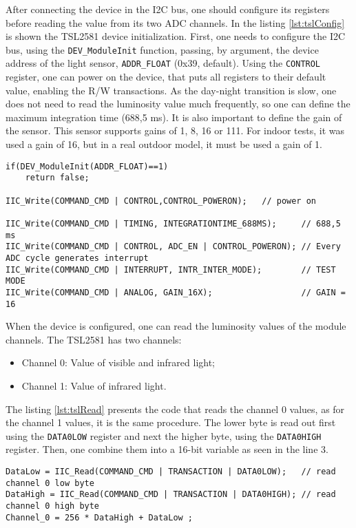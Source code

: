 After connecting the device in the I2C bus, one should configure its registers before reading the value from its two ADC channels. In the listing \ref{lst:tslConfig} is shown the TSL2581 device initialization. First, one needs to configure the I2C bus, using the \verb|DEV_ModuleInit| function, passing, by argument, the device address of the light sensor, \verb|ADDR_FLOAT| (0x39, default). Using the \verb|CONTROL| register, one can power on the device, that puts all registers to their default value, enabling the R/W transactions. As the day-night transition is slow, one does not need to read the luminosity value much frequently, so one can define the maximum integration time (688,5 ms). It is also important to define the gain of the sensor. This sensor supports gains of 1, 8, 16 or 111. For indoor tests, it was used a gain of 16, but in a real outdoor model, it must be used a gain of 1.

\begin{lstlisting}[caption={TSL2581 Initialization.}, label={lst:tslConfig}]
if(DEV_ModuleInit(ADDR_FLOAT)==1)
	return false;

IIC_Write(COMMAND_CMD | CONTROL,CONTROL_POWERON);	// power on

IIC_Write(COMMAND_CMD | TIMING, INTEGRATIONTIME_688MS);  	// 688,5 ms
IIC_Write(COMMAND_CMD | CONTROL, ADC_EN | CONTROL_POWERON); // Every ADC cycle generates interrupt
IIC_Write(COMMAND_CMD | INTERRUPT, INTR_INTER_MODE);		// TEST MODE
IIC_Write(COMMAND_CMD | ANALOG, GAIN_16X);					// GAIN = 16
\end{lstlisting}


When the device is configured, one can read the luminosity values of the module channels. The TSL2581 has two channels: 

\begin{itemize}
	\item Channel 0: Value of visible and infrared light;
	\item Channel 1: Value of infrared light.
\end{itemize}

The listing \ref{lst:tslRead} presents the code that reads the channel 0 values, as for the channel 1 values, it is the same procedure. The lower byte is read out first using the \verb|DATA0LOW| register and next the higher byte, using the \verb|DATA0HIGH| register. Then, one combine them into a 16-bit variable as seen in the line 3.

\begin{lstlisting}[caption={TSL2581 Channel 0 read.}, label={lst:tslRead}]
DataLow = IIC_Read(COMMAND_CMD | TRANSACTION | DATA0LOW); 	// read channel 0 low byte
DataHigh = IIC_Read(COMMAND_CMD | TRANSACTION | DATA0HIGH);	// read channel 0 high byte
Channel_0 = 256 * DataHigh + DataLow ;
\end{lstlisting}

